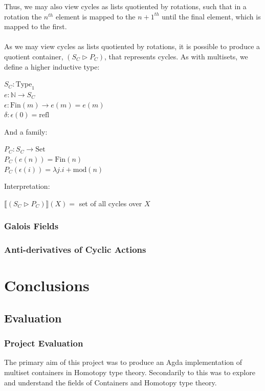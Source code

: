 \documentclass[12pt]{report}
\begin{document}
Thus, we may also view cycles as lists quotiented by rotations, such that in a rotation the $n^{th}$ element is mapped to the $n+1^{th}$ until the final element, which is mapped to the first.\\
\\
As we may view cycles as lists quotiented by rotations, it is possible to produce a quotient container, $(S_C \rhd P_C)$, that represents cycles. As with multisets, we define a higher inductive type:
\begin{center}
$S_C : \text{Type}_1$\\
$e : \mathbb{N} \to S_C$\\
$\epsilon : \text{Fin}(m) \to e(m) = e(m)$\\
$\delta : \epsilon(0) = \text{refl}$
\end{center}
\newpage
\noindent And a family:
\begin{center}
$P_C : S_C \to \text{Set}$\\
$P_C(e(n)) = \text{Fin}(n)$\\
$P_C(\epsilon(i)) = \lambda j.i+ \text{mod}(n)$
\end{center}
Interpretation:
\begin{center}
$\llbracket(S_C \rhd P_C)\rrbracket (X) = $ set of all cycles over $X$
\end{center}


\section{Galois Fields}

\section{Anti-derivatives of Cyclic Actions}










\part{Conclusions}
\chapter{Evaluation}
\section{Project Evaluation}
The primary aim of this project was to produce an Agda implementation of multiset containers in Homotopy type theory. Secondarily to this was to explore and understand the fields of Containers and Homotopy type theory.
\end{document}

